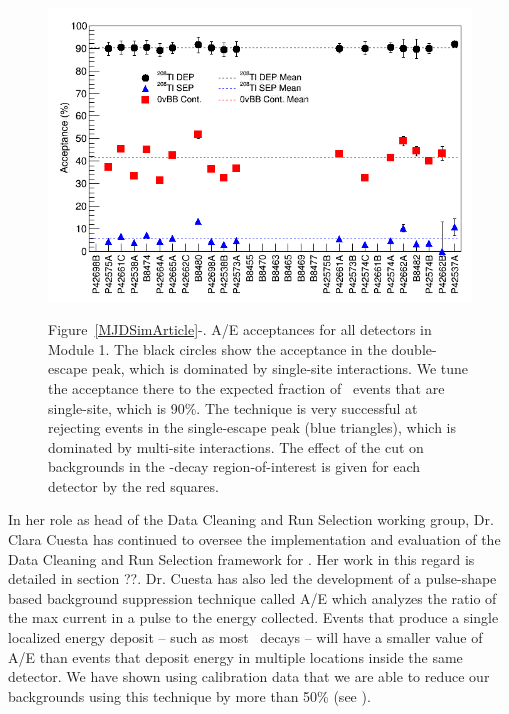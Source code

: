 \begin{figure}
\begin{center}
\hfil  \includegraphics[width=.48\textwidth]{DS1_AoverECut_Efficiency_160330.png} \hfil 

\end{center}
 \hfil \parbox{.5\textwidth}{\small Figure~\ref{MJDSimArticle}-. A/E acceptances for all detectors in Module 1. The black circles show the acceptance in the  double-escape peak, which is dominated by single-site interactions. We tune the acceptance there to the expected fraction of \nonubb\ events that are single-site, which is 90\%. The technique is very successful at rejecting events in the  single-escape peak (blue triangles), which is dominated by multi-site interactions. The effect of the cut on backgrounds in the  \nonubb-decay region-of-interest is given for each detector by the red squares. }  \hfil

\label{AoE}  %

\end{figure}

In her role as head of the Data Cleaning and Run Selection working group, Dr. Clara Cuesta has continued to oversee the implementation and evaluation of the Data Cleaning and Run Selection framework for \MJ. Her work in this regard is detailed in section ??.\newline
\indent Dr. Cuesta has also led the development of a pulse-shape based background suppression technique called A/E which analyzes the ratio of the max current in a pulse to the energy collected. Events that produce a single localized energy deposit \--- such as most \nonubb\ decays \--- will have a smaller value of A/E than events that deposit energy in multiple locations inside the same detector. We have shown using  calibration data that we are able to reduce our backgrounds using this technique by more than 50\% (see ).


